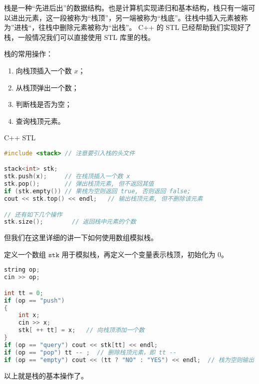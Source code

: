 
栈是一种“先进后出”的数据结构。也是计算机实现递归和基本结构，栈只有一端可以进出元素，这一段被称为“栈顶”，另一端被称为“栈底”。往栈中插入元素被称为”进栈“，往栈中删除元素被称为“出栈”。
C++ 的 STL 已经帮助我们实现好了栈，一般情况我们可以直接使用 STL 库里的栈。

栈的常用操作：
\begin{enumerate}
\item 向栈顶插入一个数 $x$；
\item 从栈顶弹出一个数；
\item 判断栈是否为空；
\item 查询栈顶元素。
\end{enumerate}

C++ STL
\begin{lstlisting}[language=cpp]
#include <stack> // 注意要引入栈的头文件

stack<int> stk;
stk.push(x);     // 在栈顶插入一个数 x
stk.pop();       // 弹出栈顶元素, 但不返回其值
if (stk.empty()) // 果栈为空则返回 true, 否则返回 false;
cout << stk.top() << endl;   // 输出栈顶元素, 但不删除该元素

// 还有如下几个操作
stk.size();        // 返回栈中元素的个数

\end{lstlisting}

但我们在这里详细的讲一下如何使用数组模拟栈。

定义一个数组 $\mathtt{stk}$ 用于模拟栈，再定义一个变量表示栈顶，初始化为 $0$。

\begin{lstlisting}[language=cpp]
string op;
cin >> op;

int tt = 0;
if (op == "push")
{
    int x;
    cin >> x;
    stk[ ++ tt] = x;   // 向栈顶添加一个数
} 
if (op == "query") cout << stk[tt] << endl;
if (op == "pop") tt -- ;  // 删除栈顶元素，即 tt -- 
if (op == "empty") cout << (tt ? "NO" : "YES") << endl;  // 栈为空则输出 YES，否则输出 NO
\end{lstlisting}

以上就是栈的基本操作了。
